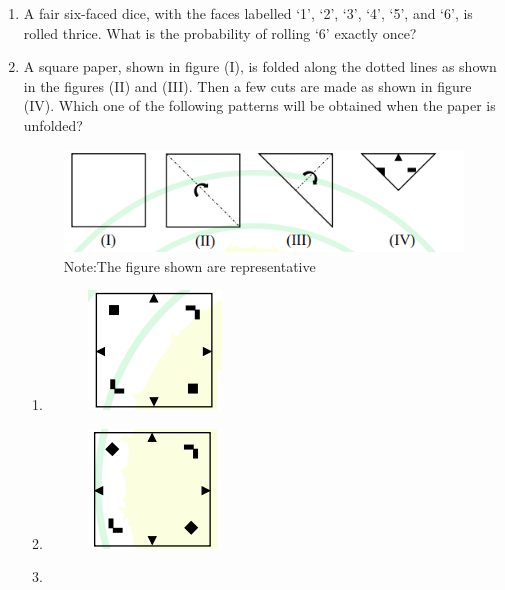 \documentclass[journal,12pt,onecolumn]{IEEEtran}
\theoremstyle{remark}
\begin{document}
\begin{enumerate}
\item A fair six-faced dice, with the faces labelled ‘1’, ‘2’, ‘3’, ‘4’, ‘5’, and ‘6’, is rolled thrice. What is the probability of rolling ‘6’ exactly once?

\begin{enumerate}
\end{enumerate}
\hfill{}

\item A square paper, shown in figure (I), is folded along the dotted lines as shown in the figures (II) and (III). Then a few cuts are made as shown in figure (IV). Which one of the following patterns will be obtained when the paper is unfolded?

\begin{figure}[H]
\centering
\includegraphics[width=0.8\columnwidth]{figs/Q-9.png}
\caption*{Note:The figure shown are representative}
\label{fig:q9}
\end{figure}


\begin{enumerate}
\item 
\begin{figure}[H]
\centering
\includegraphics[width=0.2\columnwidth]{figs/Q-9a.png}
\end{figure}  
\item 
\begin{figure}[H]
\centering
\includegraphics[width=0.2\columnwidth]{figs/Q-9b.png}
\end{figure}
\item 


\end{enumerate}
\end{enumerate}
\end{document}
